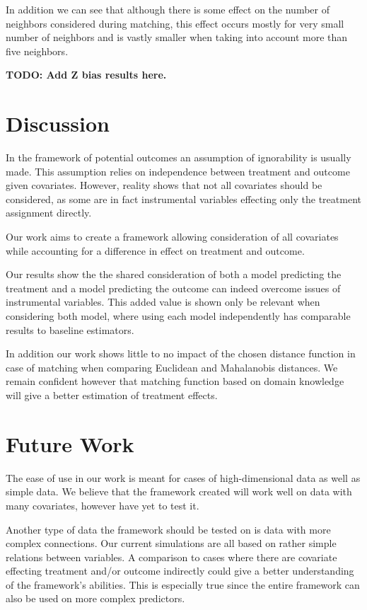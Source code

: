 \documentclass{article}
\begin{document}
In addition we can see that although there is some effect on the number of neighbors considered during matching, this effect occurs mostly for very small number of neighbors and is vastly smaller when taking into account more than five neighbors. 

\textbf{TODO: Add Z bias results here. }

\section{Discussion}
In the framework of potential outcomes an assumption of ignorability is usually made. This assumption relies on independence between treatment and outcome given covariates. However, reality shows that not all covariates should be considered, as some are in fact instrumental variables effecting only the treatment assignment directly. 

Our work aims to create a framework allowing consideration of all covariates while accounting for a difference in effect on treatment and outcome. 

Our results show the the shared consideration of both a model predicting the treatment and a model predicting the outcome can indeed overcome issues of instrumental variables. This added value is shown only be relevant when considering both model, where using each model independently has comparable results to baseline estimators.

In addition our work shows little to no impact of the chosen distance function in case of matching when comparing Euclidean and Mahalanobis distances. We remain confident however that matching function based on domain knowledge will give a better estimation of treatment effects. 

\section{Future Work}
The ease of use in our work is meant for cases of high-dimensional data as well as simple data. We believe that the framework created will work well on data with many covariates, however have yet to test it.

Another type of data the framework should be tested on is data with more complex connections. Our current simulations are all based on rather simple relations between variables. A comparison to cases where there are covariate effecting treatment and/or outcome indirectly could give a better understanding of the framework's abilities. This is especially true since the entire framework can also be used on more complex predictors.
\end{document}
